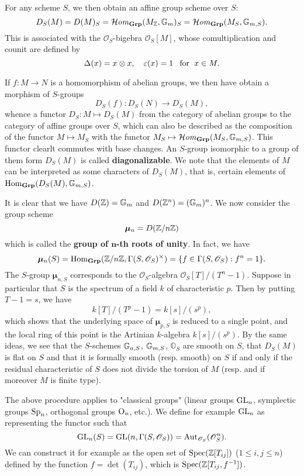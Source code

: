 For any scheme $S$, we then obtain an affine group scheme over $S$:
\[D_S(M)=D(M)_S=\operatorname{\mathcal{H}\hspace*{-0.4pt}\textit{om}\hspace{0.5pt}}_{\mathbf{Grp}}(M_{\mathbb{Z}},\mathbb{G}_m)_S=\operatorname{\mathcal{H}\hspace*{-0.4pt}\textit{om}\hspace{0.5pt}}_{\mathbf{Grp}}(M_S,\mathbb{G}_{m,S}).\]
This is associated with the $\mathscr{O}_S$-bigebra $\mathscr{O}_S[M]$, whose comultiplication and counit are defined by
\[\Delta(x)=x\otimes x,\quad \varepsilon(x)=1\hspace{8pt}\text{for}\hspace{6pt} x\in M.\]

If $f:M\to N$ is a homomorphism of abelian groups, we then have obtain a morphism of $S$-groups
\[D_S(f):D_S(N)\to D_S(M),\]
whence a functor $D_S:M\mapsto D_S(M)$ from the category of abelian groups to the category of affine groups over $S$, which can also be described as the composition of the functor $M\mapsto M_S$ with the functor $M_S\mapsto\operatorname{\mathcal{H}\hspace*{-0.4pt}\textit{om}\hspace{0.5pt}}_{\mathbf{Grp}}(M_S,\mathbb{G}_{m,S})$. This functor clearlt commutes with base changes. An $S$-group isomorphic to a group of them form $D_S(M)$ is called \textbf{diagonalizable}. We note that the elements of $M$ can be interpreted as some characters of $D_S(M)$, that is, certain elements of $\mathrm{Hom}_{\mathbf{Grp}}(D_S(M),\mathbb{G}_{m,S})$.
\begin{example}
It is clear that we have $D(\mathbb{Z})=\mathbb{G}_m$ and $D(\mathbb{Z}^n)=(\mathbb{G}_m)^n$. We now consider the group scheme
\[\bm{\mu}_n=D(\mathbb{Z}/n\mathbb{Z})\]
which is called the \textbf{group of $\bm{n}$-th roots of unity}. In fact, we have
\[\bm{\mu}_n(S)=\mathrm{Hom}_{\mathbf{Grp}}(\mathbb{Z}/n\mathbb{Z},\Gamma(S,\mathscr{O}_S)^\times)=\{f\in\Gamma(S,\mathscr{O}_S):f^n=1\}.\]
The $S$-group $\bm{\mu}_{n,S}$ corresponds to the $\mathscr{O}_S$-algebra $\mathscr{O}_S[T]/(T^n-1)$. Suppose in particular that $S$ is the spectrum of a field $k$ of characteristic $p$. Then by putting $T-1=s$, we have
\[k[T]/(T^p-1)=k[s]/(s^p),\]
which shows that the underlying space of $\bm{\mu}_{p,S}$ is reduced to a single point, and the local ring of this point is the Artinian $k$-algebra $k[s]/(s^p)$. By the same ideas, we see that the $S$-schemes $\mathbb{G}_{a,S}$, $\mathbb{G}_{m,S}$, $\mathbb{O}_S$ are smooth on $S$, that $D_S(M)$ is flat on $S$ and that it is formally smooth (resp. smooth) on $S$ if and only if the residual characteristic of $S$ does not divide the torsion of $M$ (resp. and if moreover $M$ is finite type).
\end{example}
\begin{example}
The above procedure applies to "classical groups" (linear groups $\mathrm{GL}_n$, symplectic groups $\mathrm{Sp}_n$, orthogonal groups $\mathrm{O}_n$, etc.). We define for example $\mathrm{GL}_n$ as representing the functor such that
\[\mathrm{GL}_n(S)=\mathrm{GL}(n,\Gamma(S,\mathscr{O}_S))=\mathrm{Aut}_{\mathscr{O}_S}(\mathscr{O}_S^n).\]
We can construct it for example as the open set of $\mathrm{Spec}(\mathbb{Z}[T_{ij}])$ ($1\leq i,j\leq n$) defined by the function $f=\det(T_{ij})$, which is $\mathrm{Spec}(\mathbb{Z}[T_{ij},f^{-1}])$.
\end{example}


